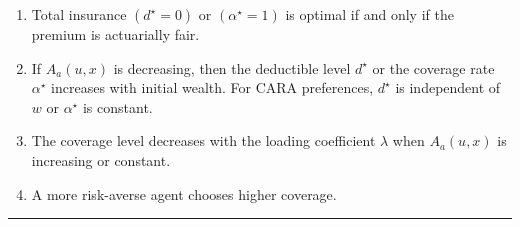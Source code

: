 \begin{f}
\begin{enumerate}
	\item Total insurance \((d^\star = 0)\) or \((\alpha^\star = 1)\) is optimal if and only if the premium is actuarially fair.
	
	\item If \(A_a(u, x)\) is decreasing, then the deductible level \(d^\star\) or the coverage rate \(\alpha^\star\) increases with initial wealth.
	For CARA preferences, \(d^\star\) is independent of \(w\) or \(\alpha^\star\) is constant.
	
	\item The coverage level decreases with the loading coefficient \(\lambda\) when \(A_a(u, x)\) is increasing or constant.
	
	\item A more risk-averse agent chooses higher coverage.
\end{enumerate}
\end{f}

\hrule

